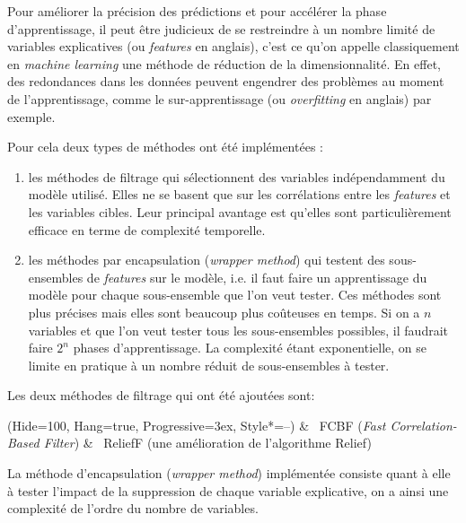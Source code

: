 Pour améliorer la précision des prédictions et pour accélérer la phase d’apprentissage, il peut être judicieux de se restreindre à un nombre limité de variables explicatives (ou \textit{features} en anglais), c’est ce qu’on appelle classiquement en \textit{machine learning} une méthode de réduction de la dimensionnalité. En effet, des redondances dans les données peuvent engendrer des problèmes au moment de l’apprentissage, comme le sur-apprentissage (ou \textit{overfitting} en anglais) par exemple.

Pour cela deux types de méthodes ont été implémentées : 
\begin{enumerate}
\item les méthodes de filtrage qui sélectionnent des variables indépendamment du modèle utilisé. Elles ne se basent que sur les corrélations entre les \textit{features} et les variables cibles. Leur principal avantage est qu’elles sont particulièrement efficace en terme de complexité temporelle.
\item les méthodes par encapsulation (\textit{wrapper method}) qui testent des sous-ensembles de \textit{features} sur le modèle, i.e. il faut faire un apprentissage du modèle pour chaque sous-ensemble que l’on veut tester. Ces méthodes sont plus précises mais elles sont beaucoup plus coûteuses en temps. Si on a $n$ variables et que l’on veut tester tous les sous-ensembles possibles, il faudrait faire $2^{n}$ phases d’apprentissage. La complexité étant exponentielle, on se limite en pratique à un nombre réduit de sous-ensembles à tester.
\end{enumerate}

Les deux méthodes de filtrage qui ont été ajoutées sont:
\begin{easylist}
\ListProperties(Hide=100, Hang=true, Progressive=3ex, Style*=--)
& ~FCBF (\textit{Fast Correlation-Based Filter}) \cite{fcbf_algorithm}
& ~ReliefF (une amélioration de l’algorithme Relief) \cite{Kononenko94estimatingattributes} 
\end{easylist}

La méthode d’encapsulation (\textit{wrapper method}) implémentée consiste quant à elle à tester l’impact de la suppression de chaque variable explicative, on a ainsi une complexité de l’ordre du nombre de variables.


